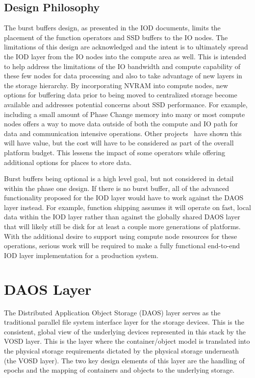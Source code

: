 \documentclass[conference]{IEEEtran} \pdfpagewidth=8.5in
\begin{document}
\subsection{Design Philosophy}

The burst buffers design, as presented in the IOD documents, limits the
placement of the function operators and SSD buffers to the IO nodes. The
limitations of this design are acknowledged and the intent is to ultimately
spread the IOD layer from the IO nodes into the compute area as well.  This is
intended to help address the limitations of the IO bandwidth and compute
capability of these few nodes for data processing and also to take advantage
of new layers in the storage hierarchy. By incorporating NVRAM into compute
nodes, new options for buffering data prior to being moved to centralized
storage become available and addresses potential concerns about SSD
performance. For example, including a small amount of Phase Change memory into
many or most compute nodes offers a way to move data outside of both the
compute and IO path for data and communication intensive operations. Other
projects~\cite{zheng:2010:predata} have shown this will have value, but the
cost will have to be considered as part of the overall platform budget. This
lessens the impact of some operators while offering additional options for
places to store data.

Burst buffers being optional is a high level goal, but not considered in detail
within the phase one design. If there is no burst buffer, all of the advanced
functionality proposed for the IOD layer would have to work against the DAOS
layer instead. For example, function shipping assumes it will operate on fast,
local data within the IOD layer rather than against the globally shared DAOS
layer that will likely still be disk for at least a couple more generations of
platforms. With the additional desire to support using compute node resources
for these operations, serious work will be required to make a fully functional
end-to-end IOD layer implementation for a production system.

\section{DAOS Layer}
\label{sec:daos}

The Distributed Application Object Storage (DAOS) layer serves as the
traditional parallel file system interface layer for the storage devices. This
is the consistent, global view of the underlying devices represented in this
stack by the VOSD layer.  This is the layer where the container/object model is
translated into the physical storage requirements dictated by the physical
storage underneath (the VOSD layer). The two key design elements of this layer
are the handling of epochs and the mapping of containers and objects to the
underlying storage.
\end{document}
